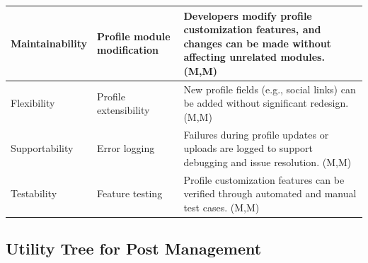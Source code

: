 \documentclass{article}
\begin{document}
\begin{table}[H]
\begin{tabular}{|p{3cm}|p{4cm}|p{7cm}|}
Maintainability
& Profile module modification
& Developers modify profile customization features, and changes can be made without affecting unrelated modules. (M,M) \\
\hline

Flexibility
& Profile extensibility
& New profile fields (e.g., social links) can be added without significant redesign. (M,M) \\
\hline

Supportability
& Error logging
& Failures during profile updates or uploads are logged to support debugging and issue resolution. (M,M) \\
\hline

Testability
& Feature testing
& Profile customization features can be verified through automated and manual test cases. (M,M) \\
\hline

\end{tabular}
\end{table}

\subsection{Utility Tree for Post Management}
\end{document}
